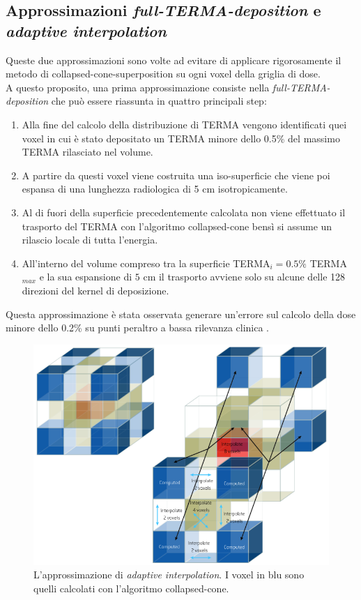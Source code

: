 {\subsection{Approssimazioni \textit{full-TERMA-deposition} e \textit{adaptive interpolation}}
Queste due approssimazioni sono volte ad evitare di applicare rigorosamente il metodo di collapsed-cone-superposition su ogni voxel della griglia di dose.\\
A questo proposito, una prima approssimazione consiste nella \textit{full-TERMA-deposition} che può essere riassunta in quattro principali step:
\begin{enumerate}
\item Alla fine del calcolo della distribuzione di TERMA vengono identificati quei voxel in cui è stato depositato un TERMA minore dello 0.5\% del massimo TERMA rilasciato nel volume.
\item A partire da questi voxel viene costruita una iso-superficie che viene poi espansa di una lunghezza radiologica di 5 cm isotropicamente.
\item Al di fuori della superficie precedentemente calcolata non viene effettuato il trasporto del TERMA con l'algoritmo collapsed-cone bensì si assume un rilascio locale di tutta l'energia.
\item All'interno del volume compreso tra la superficie TERMA$_i= 0.5\%$ TERMA$_{max}$ e la sua espansione di $5$ cm  il trasporto avviene solo su alcune delle 128 direzioni del kernel di deposizione. 
\end{enumerate}
Questa approssimazione è stata osservata generare un'errore sul calcolo della dose minore dello 0.2\% su punti peraltro a bassa rilevanza clinica \cite{RaySearchLaboratories2014}.\\

\begin{figure}
\centering
\includegraphics[width=.8\textwidth]{./cap1/dose_interp.png}
\caption{L'approssimazione di \textit{adaptive interpolation}. I voxel in blu sono quelli calcolati con l'algoritmo collapsed-cone.}
\label{fig:dose_interp}
\end{figure}

}
